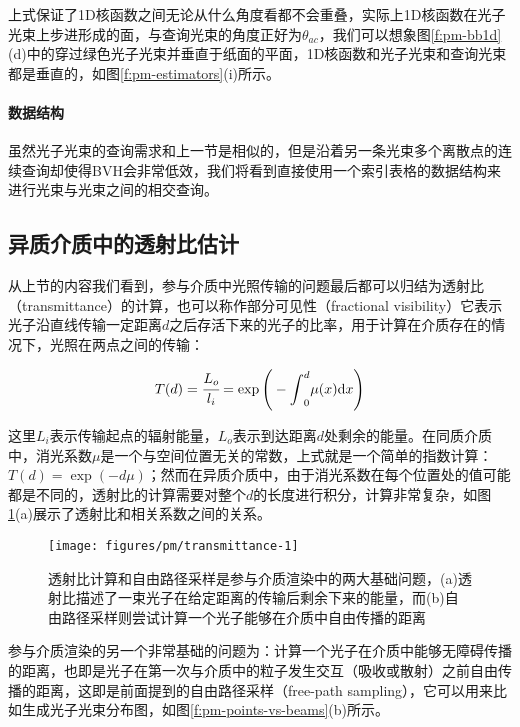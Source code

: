 上式保证了1D核函数之间无论从什么角度看都不会重叠，实际上1D核函数在光子光束上步进形成的面，与查询光束的角度正好为$\theta_{ac}$，我们可以想象图\ref{f:pm-bb1d}(d)中的穿过绿色光子光束并垂直于纸面的平面，1D核函数和光子光束和查询光束都是垂直的，如图\ref{f:pm-estimators}(i)所示。




\paragraph{数据结构}
虽然光子光束的查询需求和上一节是相似的，但是沿着另一条光束多个离散点的连续查询却使得BVH会非常低效，我们将看到\cite{a:UnifyingPointsBeamsandPathsinVolumetricLightTransportSimulation}直接使用一个索引表格的数据结构来进行光束与光束之间的相交查询。






\subsection{异质介质中的透射比估计}\label{sec:pm-transmittance-estimate}
从上节的内容我们看到，参与介质中光照传输的问题最后都可以归结为透射比（transmittance）的计算，也可以称作部分可见性（fractional visibility）它表示光子沿直线传输一定距离$d$之后存活下来的光子的比率，用于计算在介质存在的情况下，光照在两点之间的传输：

\begin{equation}
	T(d)= \cfrac{L_o}{l_i}=\exp{\Bigg(-{\rm \int}^{d}_0}\mu(x){\rm d}x\Bigg)
\end{equation}

这里$L_i$表示传输起点的辐射能量，$L_o$表示到达距离$d$处剩余的能量。在同质介质中，消光系数$\mu$是一个与空间位置无关的常数，上式就是一个简单的指数计算：$T(d)=\exp(-d\mu)$；然而在异质介质中，由于消光系数在每个位置处的值可能都是不同的，透射比的计算需要对整个$d$的长度进行积分，计算非常复杂，如图\ref{f:pm-transmittance-vs-fps}(a)展示了透射比和相关系数之间的关系。

\begin{figure}
	\sidecaption
	\texttt{[image: figures/pm/transmittance-1]}
	\caption{透射比计算和自由路径采样是参与介质渲染中的两大基础问题，(a)透射比描述了一束光子在给定距离的传输后剩余下来的能量，而(b)自由路径采样则尝试计算一个光子能够在介质中自由传播的距离}
	\label{f:pm-transmittance-vs-fps}
\end{figure}

参与介质渲染的另一个非常基础的问题为：计算一个光子在介质中能够无障碍传播的距离，也即是光子在第一次与介质中的粒子发生交互（吸收或散射）之前自由传播的距离，这即是前面提到的自由路径采样（free-path sampling），它可以用来比如生成光子光束分布图，如图\ref{f:pm-points-vs-beams}(b)所示。

